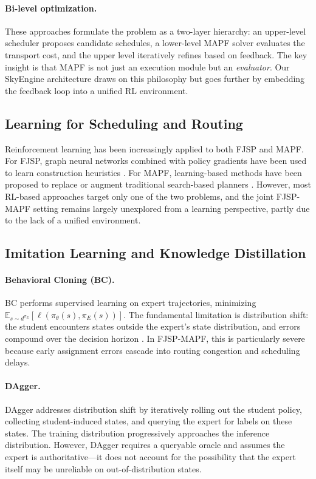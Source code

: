 \documentclass[11pt,a4paper]{article}
\begin{document}
\paragraph{Bi-level optimization.}
These approaches formulate the problem as a two-layer hierarchy: an upper-level scheduler proposes candidate schedules, a lower-level MAPF solver evaluates the transport cost, and the upper level iteratively refines based on feedback. The key insight is that MAPF is not just an execution module but an \emph{evaluator}. Our SkyEngine architecture draws on this philosophy but goes further by embedding the feedback loop into a unified RL environment.

\subsection{Learning for Scheduling and Routing}

Reinforcement learning has been increasingly applied to both FJSP and MAPF. For FJSP, graph neural networks combined with policy gradients have been used to learn construction heuristics \citep{ref4}. For MAPF, learning-based methods have been proposed to replace or augment traditional search-based planners \citep{ref5}. However, most RL-based approaches target only one of the two problems, and the joint FJSP-MAPF setting remains largely unexplored from a learning perspective, partly due to the lack of a unified environment.

\subsection{Imitation Learning and Knowledge Distillation}

\paragraph{Behavioral Cloning (BC).}
BC performs supervised learning on expert trajectories, minimizing $\mathbb{E}_{s \sim d^{\pi_E}} [\ell(\pi_\theta(s), \pi_E(s))]$. The fundamental limitation is distribution shift: the student encounters states outside the expert's state distribution, and errors compound over the decision horizon \citep{ref6}. In FJSP-MAPF, this is particularly severe because early assignment errors cascade into routing congestion and scheduling delays.

\paragraph{DAgger.}
DAgger \citep{ref7} addresses distribution shift by iteratively rolling out the student policy, collecting student-induced states, and querying the expert for labels on these states. The training distribution progressively approaches the inference distribution. However, DAgger requires a queryable oracle and assumes the expert is authoritative---it does not account for the possibility that the expert itself may be unreliable on out-of-distribution states.
\end{document}
